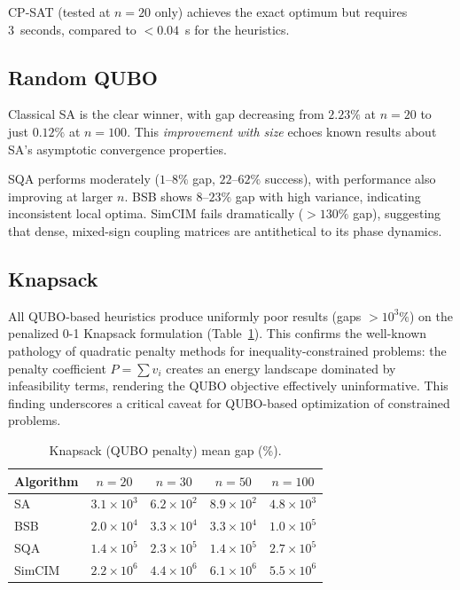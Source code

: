 \documentclass[10pt,twocolumn]{article}
\begin{document}
CP-SAT (tested at $n=20$ only) achieves the exact optimum but requires 3~seconds, compared to $<0.04$~s for the heuristics.

\subsection{Random QUBO}
Classical SA is the clear winner, with gap decreasing from $2.23\%$ at $n=20$ to just $0.12\%$ at $n=100$. This \emph{improvement with size} echoes known results about SA's asymptotic convergence properties.

SQA performs moderately ($1$--$8\%$ gap, $22$--$62\%$ success), with performance also improving at larger $n$. BSB shows $8$--$23\%$ gap with high variance, indicating inconsistent local optima. SimCIM fails dramatically ($>130\%$ gap), suggesting that dense, mixed-sign coupling matrices are antithetical to its phase dynamics.

\subsection{Knapsack}
All QUBO-based heuristics produce uniformly poor results (gaps $>10^3\%$) on the penalized 0-1 Knapsack formulation (Table~\ref{tab:knap}). This confirms the well-known pathology of quadratic penalty methods for inequality-constrained problems: the penalty coefficient $P=\sum v_i$ creates an energy landscape dominated by infeasibility terms, rendering the QUBO objective effectively uninformative. This finding underscores a critical caveat for QUBO-based optimization of constrained problems.

\begin{table}[t]
\centering
\small
\caption{Knapsack (QUBO penalty) mean gap (\%).}\label{tab:knap}
\begin{tabular}{lcccc}
\toprule
Algorithm & $n=20$ & $n=30$ & $n=50$ & $n=100$\\
\midrule
SA & $3.1\times10^3$ & $6.2\times10^2$ & $8.9\times10^2$ & $4.8\times10^3$ \\
BSB & $2.0\times10^4$ & $3.3\times10^4$ & $3.3\times10^4$ & $1.0\times10^5$ \\
SQA & $1.4\times10^5$ & $2.3\times10^5$ & $1.4\times10^5$ & $2.7\times10^5$ \\
SimCIM & $2.2\times10^6$ & $4.4\times10^6$ & $6.1\times10^6$ & $5.5\times10^6$ \\
\bottomrule
\end{tabular}
\end{table}
\end{document}
